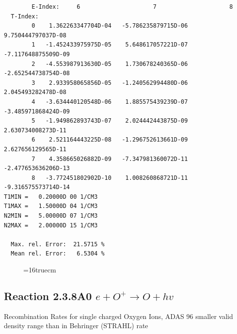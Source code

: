 \documentclass[12pt,dvipdfmx]{article}
\begin{document}
\begin{small}
\begin{verbatim}
        E-Index:     6                     7                     8
  T-Index:
        0    1.362263347704D-04   -5.786235879715D-06    9.750444797037D-08
        1   -1.452433975975D-05    5.648617057221D-07   -7.117648875509D-09
        2   -4.553987913630D-05    1.730678240365D-06   -2.652544738754D-08
        3    2.933958065856D-05   -1.240562994480D-06    2.045493282478D-08
        4   -3.634440120548D-06    1.885575439239D-07   -3.485971868424D-09
        5   -1.949862893743D-07    2.024442443875D-09    2.630734008273D-11
        6    2.521164443225D-08   -1.296752613661D-09    2.627656129565D-11
        7    4.358665026882D-09   -7.347981360072D-11   -2.477653636206D-13
        8   -3.772451802902D-10    1.008260868721D-11   -9.316575573714D-14
T1MIN =   0.20000D 00 1/CM3
T1MAX =   1.50000D 04 1/CM3
N2MIN =   5.00000D 07 1/CM3
N2MAX =   2.00000D 15 1/CM3

  Max. rel. Error:  21.5715 %
  Mean rel. Error:   6.5304 %

\end{verbatim}\end{small}
\begin{figure} \label{2.3.7A0}
\epsfxsize=16truecm 
\end{figure}
\newpage

\subsection{
Reaction 2.3.8A0  $e + O^{+} \rightarrow O + hv$ }
 Recombination Rates for single  charged Oxygen Ions, ADAS 96
 smaller valid density range than in Behringer (STRAHL) rate
\end{document}
